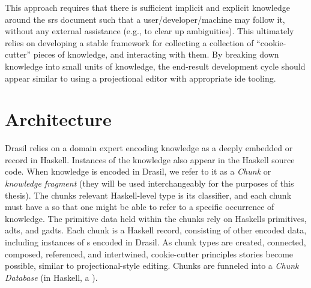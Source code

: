 This approach requires that there is sufficient implicit and explicit knowledge
around the \acs{srs} document such that a user/developer/machine may follow it,
without any external assistance (e.g., to clear up ambiguities). This ultimately
relies on developing a stable framework for collecting a collection of
``cookie-cutter'' pieces of knowledge, and interacting with them. By breaking
down knowledge into small units of knowledge, the end-result development cycle
should appear similar to using a projectional editor with appropriate \acs{ide}
tooling.


\drasilLogoImg{}

\drasilPersonification

\section{Architecture}

Drasil relies on a domain expert encoding knowledge as a deeply embedded
 or record in Haskell. Instances of the knowledge also appear in the
Haskell source code. When knowledge is encoded in Drasil, we refer to it as a
\textit{Chunk} or \textit{knowledge fragment} (they will be used interchangeably
for the purposes of this thesis). The chunks relevant Haskell-level type is its
classifier, and each chunk must have a  so that one might be able to
refer to a specific occurrence of knowledge. The primitive data held within the
chunks rely on Haskells primitives, \acsp{adt}, and \acsp{gadt}. Each chunk is a
Haskell record, consisting of other encoded data, including instances of
s encoded in Drasil. As chunk types are created, connected, composed,
referenced, and intertwined, cookie-cutter principles stories become possible,
similar to projectional-style editing. Chunks are funneled into a \textit{Chunk
      Database} (in Haskell, a \ChunkDB{}).

\originalChunkDBHaskell{}

